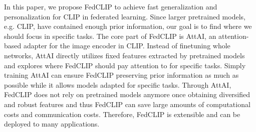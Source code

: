 \documentclass[11pt]{article}
\newcommand{\method}{FedCLIP\xspace}
\newcommand{\mecom}{AttAI\xspace}
\newcommand{\wjdd}[1]{\todo[linecolor=cyan,backgroundcolor=cyan!25,bordercolor=cyan,size=\scriptsize]{(WJD): #1}}
\begin{document}
In this paper, we propose \method to achieve fast generalization and personalization for CLIP in federated learning. 
Since larger pretrained models, e.g. CLIP, have contained enough prior information, our goal is to find where we should focus in specific tasks.
The core part of \method is \mecom, an attention-based adapter for the image encoder in CLIP.
Instead of finetuning whole networks, \mecom directly utilizes fixed features extracted by pretrained models and explores where \method should pay attention to for specific tasks.
Simply training \mecom can ensure \method preserving prior information as much as possible while it allows models adapted for specific tasks. 
Through \mecom, \method does not rely on pretrained models anymore once obtaining diversified and robust features and thus \method can save large amounts of computational costs and communication costs.
Therefore, \method is extensible and can be deployed to many applications.

\end{document}
